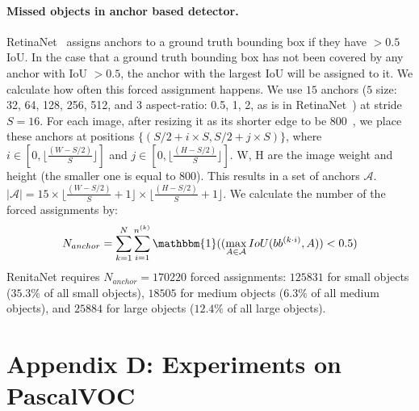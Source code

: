 \documentclass[10pt,twocolumn,letterpaper]{article}
\begin{document}
\paragraph{Missed objects in anchor based detector.}
RetinaNet~\cite{lin2018focal} assigns anchors to a ground truth bounding box if they have $> 0.5$ IoU.
In the case that a ground truth bounding box has not been covered by any anchor with IoU $>0.5$, the anchor with the largest IoU will be assigned to it. 
We calculate how often this forced assignment happens.
We use $15$ anchors ($5$ size: 32, 64, 128, 256, 512, and $3$ aspect-ratio: 0.5, 1, 2,  as is in RetinaNet~\cite{lin2018focal}) at stride $S = 16$.
For each image, after resizing it as its shorter edge to be $800$~\cite{lin2018focal}, we place these anchors at positions $\{(S / 2 + i \times S, S / 2 + j \times S)\}$, where $i \in [0, \lfloor\frac{(W - S/2)}{S}\rfloor]$ and $j \in [0, \lfloor\frac{(H - S/2)}{S}\rfloor]$. W, H are the image weight and height (the smaller one is equal to 800).
This results in a set of anchors $\mathcal{A}$. $|\mathcal{A}| = 15 \times \lfloor\frac{(W - S/2)}{S} + 1\rfloor \times \lfloor\frac{(H - S/2)}{S} + 1\rfloor$.
We calculate the number of the forced assignments by:
\begin{equation}
    N_{anchor} = \sum_{k=1}^{N} \sum_{i=1}^{n^{(k)}} \mathbbm{1} ((\max_{A \in \mathcal{A}}  IoU(bb^{(k\cdot i)}, A)) < 0.5)
\end{equation}
RenitaNet requires $N_{anchor} = 170220$ forced assignments: $125831$ for small objects ($35.3\%$ of all small objects), $18505$ for medium objects ($6.3\%$ of all medium objects), and $25884$ for large objects ($12.4\%$ of all large objects).

\section*{Appendix D: Experiments on PascalVOC}
\end{document}
